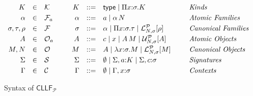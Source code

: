 \documentclass[submission,copyright,creativecommons]{eptcs}
\theoremstyle{plain}
\theoremstyle{definition}
\newcommand{\CLLFP} {\mbox{$\mathsf{CLLF}_{\mathcal P}$}}
\newcommand {\at}   {\,}               \newcommand {\of}   {{:}}              \newcommand {\Type} {{\mathsf {type}}} \newcommand {\sig}  {{\mathsf {sig}}}  \newcommand {\ctx}  {{\mathsf {ctx}}}  \newcommand {\kind}  {{\mathsf {kind}}}
\newcommand {\App}    [2] {{#1} \at {#2}}                         \newcommand {\Prod}   [3] {\Pi {#1} \of {#2}.{#3}}            \newcommand {\Abs}    [3] {\lambda {#1} \of {#2}.{#3}}
\newcommand {\Lock}   [4] {{\mathcal{L}}^{#1}_{#2, #3}[{#4}]} \newcommand {\LockC} [3] {{\mathcal{L}}^{#1}_{#2}      [{#3}]}
\newcommand {\SIG} {{\mathcal S}}    \newcommand {\CTX} {{\mathcal C}}    \newcommand {\KK}  {{\mathcal K}}    \newcommand {\FF}  {{\mathcal F}}    \newcommand {\OO}  {{\mathcal O}}
\renewcommand {\P} {\mathcal{P}} \newcommand {\Q} {\mathcal{Q}}
\newcommand{\up}[1]   {\vspace{-#1mm}}
\begin{document}
\begin{figure}[t!]
 \up{2}
 {\small
 \begin{center}
   $
   \begin{array}{rcl@{\hspace{0.9cm}}rcl@{\hspace{0.9cm}}l}

K & \in & \KK & K & ::=
     & \Type \mid {\Prod x \sigma K} & \mbox{\em Kinds}
                                            \\[1mm]

\alpha & \in & \AF & \alpha & ::=
     & a \mid {\App \alpha N} & \mbox{\em Atomic Families}
     \\[1mm]

\sigma, \tau, \rho & \in & \FF & \sigma & ::=
     & \alpha \mid {\Prod x {\sigma} {\tau}} \mid {\Lock {\P} N
       {\sigma} {\rho}}  & \mbox{\em Canonical Families}
     \\[1mm]

A & \in & \AO & A & ::=
     & c \mid x \mid {\App {A} {M}} \mid {\Unlock {\P} {N} \sigma
       {A}} &  \mbox{\em Atomic Objects}
     \\[1mm]

M, N & \in & \OO & M & ::=
     & A \mid {\Abs x \sigma M} \mid {\Lock {\P} {N} {\sigma} {M}} &
                                                                     \mbox{\em Canonical Objects}
     \\[1mm]
\Sigma & \in & \SIG & \Sigma & ::= &
                                          \emptyset \mid \Sigma,a \of K \mid \Sigma, c \of \sigma &
                                                                                                    \mbox{\em
                                                                                                    Signatures}

     \\[1mm]
\Gamma & \in & \CTX & \Gamma & ::= &
                                          \emptyset \mid \Gamma, x\of \sigma &
                                                                               \mbox{\em
                                                                               Contexts}

 \end{array}
 $
 \end{center} }
 \up{4}
 \caption{Syntax of \CLLFP} \up{5}
 \label{fig:cllfsyntax}
\end{figure}
\end{document}
